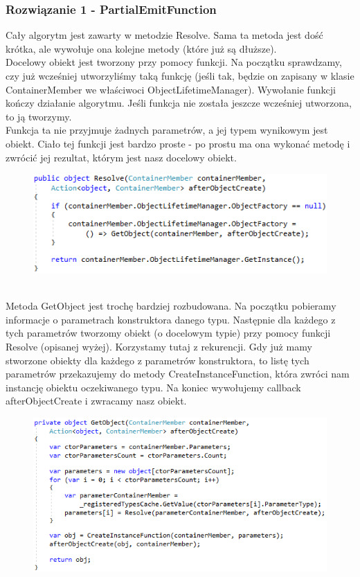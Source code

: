 \documentclass[12pt]{article}
\begin{document}
\subsubsection{Rozwiązanie 1 - PartialEmitFunction}
Cały algorytm jest zawarty w metodzie Resolve. Sama ta metoda jest dość krótka, ale wywołuje ona kolejne metody (które już są dłuższe).\\
Docelowy obiekt jest tworzony przy pomocy funkcji. Na początku sprawdzamy, czy już wcześniej utworzyliśmy taką funkcję (jeśli tak, będzie on zapisany w klasie ContainerMember we właściwoci ObjectLifetimeManager). Wywołanie funkcji kończy działanie algorytmu. Jeśli funkcja nie została jeszcze wcześniej utworzona, to ją tworzymy.\\
Funkcja ta nie przyjmuje żadnych parametrów, a jej typem wynikowym jest obiekt. Ciało tej funkcji jest bardzo proste - po prostu ma ona wykonać metodę i zwrócić jej rezultat, którym jest nasz docelowy obiekt.
\begin{figure}[h]
	\begin{raggedleft}
  		\includegraphics{PartialEmitFunction_Resolve.png}
	\end{raggedleft}
\end{figure}\\
Metoda GetObject jest trochę bardziej rozbudowana. Na początku pobieramy informacje o parametrach konstruktora danego typu. Następnie dla każdego z tych parametrów tworzomy obiekt (o docelowym typie) przy pomocy funkcji Resolve (opisanej wyżej). Korzystamy tutaj z rekurencji. Gdy już mamy stworzone obiekty dla każdego z parametrów konstruktora, to listę tych parametrów przekazujemy do metody CreateInstanceFunction, która zwróci nam instancję obiektu oczekiwanego typu. Na koniec wywołujemy callback afterObjectCreate i zwracamy nasz obiekt.
\begin{figure}[h]
	\begin{raggedleft}
  		\includegraphics{PartialEmitFunction_GetObject.png}
	\end{raggedleft}
\end{figure}\\
\end{document}
